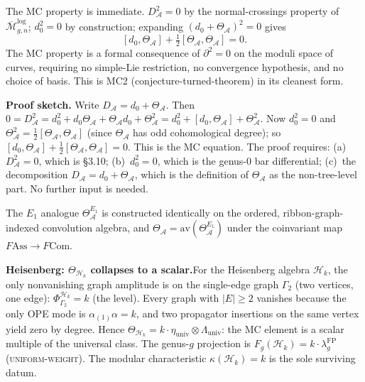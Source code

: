 \documentclass[11pt,reqno]{amsart}
\theoremstyle{definition}
\theoremstyle{remark}
\providecommand{\cA}{\mathcal{A}}
\providecommand{\cH}{\mathcal{H}}
\providecommand{\cM}{\mathcal{M}}
\providecommand{\Ass}{\mathrm{Ass}}
\providecommand{\Com}{\mathrm{Com}}
\numberwithin{equation}{section}
\begin{document}
The MC property is immediate. $D_\cA^2=0$ by the normal-crossings
property of $\overline{\cM}_{g,n}^{\log}$; $d_0^2=0$ by construction;
expanding $(d_0+\Theta_\cA)^2=0$ gives
\[
[d_0,\Theta_\cA]+\tfrac12[\Theta_\cA,\Theta_\cA]=0.
\]
The MC property is a formal consequence of $\partial^2=0$ on the
moduli space of curves, requiring no simple-Lie restriction, no
convergence hypothesis, and no choice of basis. This is MC2
(conjecture-turned-theorem) in its cleanest form.

\medskip
\noindent\textbf{Proof sketch.}\enspace
Write $D_\cA=d_0+\Theta_\cA$. Then
$0=D_\cA^2=d_0^2+d_0\Theta_\cA+\Theta_\cA d_0+\Theta_\cA^2
=d_0^2+[d_0,\Theta_\cA]+\Theta_\cA^2$.
Now $d_0^2=0$ and $\Theta_\cA^2=\tfrac12[\Theta_\cA,\Theta_\cA]$
(since $\Theta_\cA$ has odd cohomological degree); so
$[d_0,\Theta_\cA]+\tfrac12[\Theta_\cA,\Theta_\cA]=0$.
This is the MC equation. The proof requires:
(a)~$D_\cA^2=0$, which is \S3.10;
(b)~$d_0^2=0$, which is the genus-$0$ bar differential;
(c)~the decomposition $D_\cA=d_0+\Theta_\cA$, which is the definition
of $\Theta_\cA$ as the non-tree-level part. No further input is needed.

The $E_1$ analogue $\Theta^{E_1}_\cA$ is constructed identically on
the ordered, ribbon-graph-indexed convolution algebra, and
$\Theta_\cA=\mathrm{av}(\Theta^{E_1}_\cA)$ under the coinvariant map
$F\!\Ass\to F\Com$.

\medskip
\noindent\textbf{Heisenberg: $\Theta_{\cH_k}$ collapses to a
scalar.}\enspace For the Heisenberg algebra $\cH_k$, the only
nonvanishing graph amplitude is on the single-edge graph
$\Gamma_2$ (two vertices, one edge): $\Phi^{\cH_k}_{\Gamma_2} = k$
(the level). Every graph with $|E| \ge 2$ vanishes because the only
OPE mode is $\alpha_{(1)}\alpha = k$, and two propagator insertions
on the same vertex yield zero by degree. Hence
$\Theta_{\cH_k} = k \cdot \eta_{\mathrm{univ}} \otimes
\Lambda_{\mathrm{univ}}$: the MC element is a scalar multiple of
the universal class. The genus-$g$ projection is
$F_g(\cH_k) = k \cdot \lambda_g^{\mathrm{FP}}$
\textup{(\textsc{uniform-weight})}. The modular characteristic
$\kappa(\cH_k) = k$ is the sole surviving datum.
\end{document}
